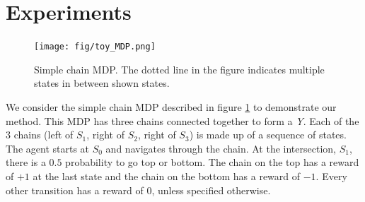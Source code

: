 
\section{Experiments}
\begin{figure}[h]
    \centering
    \texttt{[image: fig/toy\_MDP.png]}
    \caption{Simple chain MDP. The dotted line in the figure indicates multiple states in between shown states.}
    \label{fig:toy MDP}
\end{figure}
We consider the simple chain MDP described in figure \ref{fig:toy MDP} to demonstrate our method. This MDP has three chains connected together to form a \emph{Y}. Each of the 3 chains (left of $S_1$, right of $S_2$, right of $S_3$) is made up of a sequence of states. The agent starts at $S_0$ and navigates through the chain. At the intersection, $S_1$, there is a $0.5$ probability to go top or bottom. The chain on the top has a reward of $+1$ at the last state and the chain on the bottom has a reward of $-1$. Every other transition has a reward of $0$, unless specified otherwise.\\
